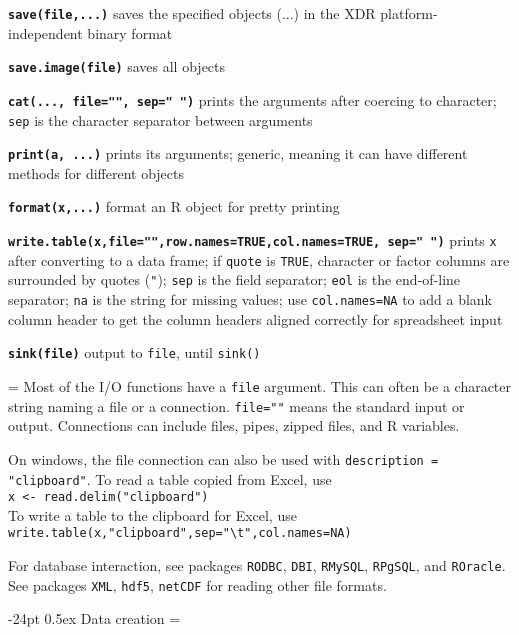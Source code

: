 \documentclass[10pt,landscape]{article}
\makeatletter
\renewcommand\section{\@startsection{section}{1}{0mm}%
                                     {-24pt}%
                                     {0.5ex}%
                                {\color{blue}\normalfont\large\bfseries}}
\newcommand{\code}{\texttt}
\newcommand{\bcode}[1]{\texttt{\textbf{#1}}}
\makeatother
\begin{document}
\begin{multicols*}{3}
\bcode{save(file,...)} saves the specified objects (...) in the XDR
platform-independent binary format

\bcode{save.image(file)} saves all objects

\bcode{cat(..., file="", sep=" ")} prints the arguments after coercing to
character; \code{sep} is the character separator between arguments

\bcode{print(a, ...)} prints its arguments; generic, meaning it can
have different methods for different objects

\bcode{format(x,...)} format an R object for pretty printing

\bcode{write.table(x,file="",row.names=TRUE,col.names=TRUE, sep=" ")}
prints \code{x} after converting to a data frame; if \code{quote} is
                 \code{TRUE}, character or factor columns are
                 surrounded by quotes (\code{"}); \code{sep} is the field
                 separator; \code{eol} is the end-of-line separator;
                 \code{na} is the string for missing values; use
                 \code{col.names=NA} to add a blank column header to
                 get the column headers aligned correctly for
                 spreadsheet input

\bcode{sink(file)} output to \code{file}, until \code{sink()}

\everypar={\hangindent=0mm}
Most of the I/O functions have a \code{file} argument. This can often
be a character string naming a file or a connection.  \code{file=""} means the standard input or
output. Connections can include files, pipes, zipped
files, and R variables.

On windows, the file connection can also be used with \code{description =
"clipboard"}. To read a table copied from Excel, use \\
\code{x <- read.delim("clipboard")}\\
To write a table to the clipboard for Excel, use \\
\code{write.table(x,"clipboard",sep="\textbackslash t",col.names=NA)}

For database interaction, see packages \code{RODBC}, \code{DBI},
\code{RMySQL}, \code{RPgSQL}, and \code{ROracle}. See packages \code{XML}, \code{hdf5}, \code{netCDF} for reading
other file formats.

\section{Data creation}
\everypar={\hangindent=9mm}


\end{multicols*}
\end{document}
